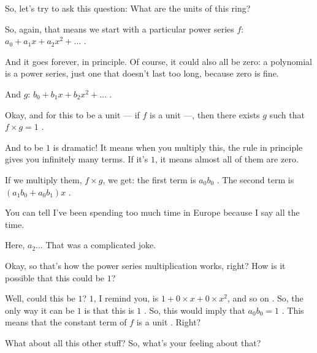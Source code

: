 \begin{speech}[00:32:38 - 00:35:07]
So, let's try to ask this question: What are the units of this ring? 

So, again, that means we start with a particular power series $f$: $a_0 + a_1 x + a_2 x^2 + \dots$ .

And it goes forever, in principle. Of course, it could also all be zero: a polynomial is a power series, just one that doesn't last too long, because zero is fine.

And $g$: $b_0 + b_1 x + b_2 x^2 + \dots$ .

Okay, and for this to be a unit --- if $f$ is a unit ---, then there exists $g$ such that $f \times g = 1$ .

And to be $1$ is dramatic! It means when you multiply this, the rule in principle gives you infinitely many terms. If it's $1$, it means almost all of them are zero.

If we multiply them, $f \times g$, we get: the first term is $a_0 b_0$ . The second term is $(a_1 b_0 + a_0 b_1) x$ .

You can tell I've been spending too much time in Europe because I say  all the time. 

Here, $a_2$... That was a complicated joke. 

Okay, so that's how the power series multiplication works, right? How is it possible that this could be $1$?

Well, could this be $1$? $1$, I remind you, is $1 + 0 \times x + 0 \times x^2$, and so on . So, the only way it can be $1$ is that this is $1$ . So, this would imply that $a_0 b_0 = 1$ . This means that the constant term of $f$ is a unit . Right?

What about all this other stuff? So, what's your feeling about that?
\end{speech}

